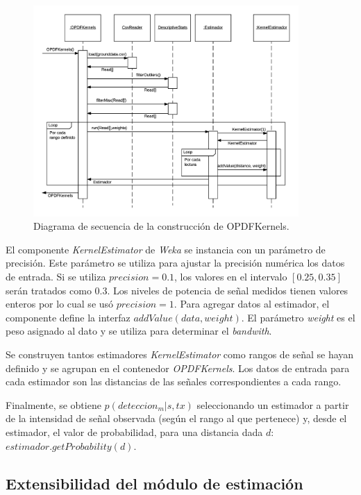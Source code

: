  \begin{figure}[!htp]
	\centering
	\includegraphics[width=0.9\textwidth]{images/sequence-opdfkernels.png}
	\captionsetup{width=0.9\textwidth}
	\caption{Diagrama de secuencia de la construcción de OPDFKernels.}
    \label{fig:sequence-opdfkernels}
\end{figure}

 El componente \textit{KernelEstimator} de \textit{Weka} se instancia con un parámetro de precisión. Este parámetro se utiliza para ajustar la precisión numérica los datos de entrada. Si se utiliza $precision=0.1$, los valores en el intervalo $[0.25, 0.35]$ serán tratados como 0.3. Los niveles de potencia de señal medidos tienen valores enteros por lo cual se usó $precision=1$. Para agregar datos al estimador, el componente define la interfaz $addValue(data,weight)$. El parámetro \textit{weight} es el peso asignado al dato y se utiliza para determinar el \textit{bandwith}.  
 
 Se construyen tantos estimadores \textit{KernelEstimator} como rangos de señal se hayan definido y se agrupan en el contenedor \textit{OPDFKernels}. Los datos de entrada para cada estimador son las distancias de las señales correspondientes a cada rango. 
 
 Finalmente, se obtiene $p(deteccion_m|s,tx)$ seleccionando un estimador a partir de la intensidad de señal observada (según el rango al que pertenece) y, desde el estimador, el valor de probabilidad, para una distancia dada $d$: $estimador.getProbability(d)$.

\subsection{Extensibilidad del módulo de estimación}

